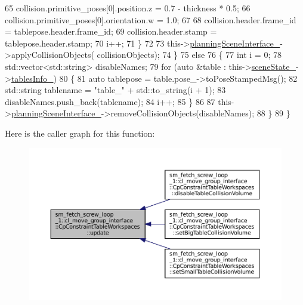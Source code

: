 \begin{DoxyCode}
65                     collision.primitive\_poses[0].position.z = 0.7 - thickness * 0.5;
66                     collision.primitive\_poses[0].orientation.w = 1.0;
67 
68                     collision.header.frame\_id = tablepose.header.frame\_id;
69                     collision.header.stamp = tablepose.header.stamp;
70                     i++;
71                 \}
72 
73                 this->\hyperlink{classsm__fetch__screw__loop__1_1_1cl__move__group__interface_1_1CpConstraintTableWorkspaces_a359b7c6bc0fe586c3acaef54981dfa91}{planningSceneInterface\_}->applyCollisionObjects(
      collisionObjects);
74             \}
75             \textcolor{keywordflow}{else}
76             \{
77                 \textcolor{keywordtype}{int} i = 0;
78                 std::vector<std::string> disableNames;
79                 \textcolor{keywordflow}{for} (\textcolor{keyword}{auto} &table : this->\hyperlink{classsm__fetch__screw__loop__1_1_1cl__move__group__interface_1_1CpConstraintTableWorkspaces_ae49397b918179c999bd9d4b1c785713f}{sceneState\_}->\hyperlink{classsm__fetch__screw__loop__1_1_1cl__perception__system_1_1CpSceneState_adc87f7a438a7030adfaa9e94f0e8f4e0}{tablesInfo\_})
80                 \{
81                     \textcolor{keyword}{auto} tablepose = table.pose\_->toPoseStampedMsg();
82                     std::string tablename = \textcolor{stringliteral}{"table\_"} + std::to\_string(i + 1);
83                     disableNames.push\_back(tablename);
84                     i++;
85                 \}
86 
87                 this->\hyperlink{classsm__fetch__screw__loop__1_1_1cl__move__group__interface_1_1CpConstraintTableWorkspaces_a359b7c6bc0fe586c3acaef54981dfa91}{planningSceneInterface\_}->removeCollisionObjects(disableNames);
88             \}
89         \}
\end{DoxyCode}
Here is the caller graph for this function\+:
\nopagebreak
\begin{figure}[H]
\begin{center}
\leavevmode
\includegraphics[width=350pt]{classsm__fetch__screw__loop__1_1_1cl__move__group__interface_1_1CpConstraintTableWorkspaces_a24fc1c2ba2d6f09df2cca9bf0c3d3b20_icgraph}
\end{center}
\end{figure}


